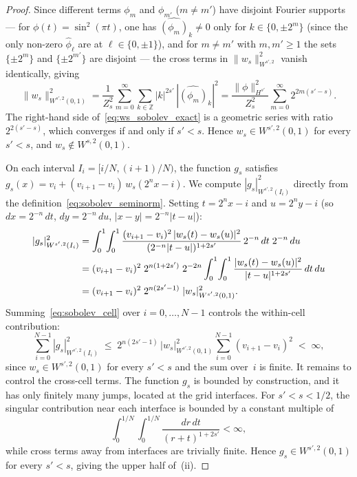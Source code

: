 \documentclass[12pt,a4paper]{article}
\theoremstyle{plain}
\theoremstyle{definition}
\theoremstyle{remark}
\begin{document}
\begin{proof}
Since different terms $\phi_m$ and $\phi_{m'}$ ($m\neq m'$) have
disjoint Fourier supports — for $\phi(t)=\sin^2(\pi t)$, one has
$\widehat{(\phi_m)}_k\neq 0$ only for $k\in\{0,\pm 2^m\}$
(since the only non-zero $\hat\phi_\ell$ are at $\ell\in\{0,\pm 1\}$),
and for $m\neq m'$ with $m,m'\geq 1$ the sets $\{\pm 2^m\}$ and
$\{\pm 2^{m'}\}$ are disjoint — the cross terms in $\|w_s\|^2_{W^{s',2}}$ vanish
identically, giving
\begin{equation}
  \|w_s\|^2_{W^{s',2}(0,1)}
  = \frac{1}{Z_s^2}
    \sum_{m=0}^\infty
    \sum_{k\in\mathbb{Z}}|k|^{2s'}\,|\widehat{(\phi_m)}_k|^2
  = \frac{\|\phi\|^2_{H^{s'}}}{Z_s^2}
    \sum_{m=0}^\infty 2^{2m(s'-s)}.
  \label{eq:ws_sobolev_exact}
\end{equation}
The right-hand side of~\eqref{eq:ws_sobolev_exact} is a geometric
series with ratio $2^{2(s'-s)}$, which converges if and only if
$s'<s$.
Hence $w_s\in W^{s',2}(0,1)$ for every $s'<s$, and
$w_s\notin W^{s,2}(0,1)$.

On each interval $I_i = [i/N,(i+1)/N)$, the function $g_s$ satisfies
$g_s(x) = v_i + (v_{i+1}-v_i)\,w_s(2^n x - i)$.
We compute $|g_s|^2_{W^{s',2}(I_i)}$ directly from the
definition~\eqref{eq:sobolev_seminorm}.
Setting $t = 2^n x - i$ and $u = 2^n y - i$
(so $dx = 2^{-n}\,dt$, $dy = 2^{-n}\,du$, $|x-y| = 2^{-n}|t-u|$):
\begin{align}
  |g_s|^2_{W^{s',2}(I_i)}
  &= \int_0^1\!\int_0^1
     \frac{(v_{i+1}-v_i)^2\,|w_s(t)-w_s(u)|^2}
          {(2^{-n}|t-u|)^{1+2s'}}\,
     2^{-n}\,dt\;2^{-n}\,du \notag\\
  &= (v_{i+1}-v_i)^2\;2^{n(1+2s')}\;2^{-2n}
     \int_0^1\!\int_0^1
     \frac{|w_s(t)-w_s(u)|^2}{|t-u|^{1+2s'}}\,dt\,du \notag\\
  &= (v_{i+1}-v_i)^2\;2^{n(2s'-1)}\;
     |w_s|^2_{W^{s',2}(0,1)}.
  \label{eq:sobolev_cell}
\end{align}
Summing~\eqref{eq:sobolev_cell} over $i = 0,\ldots,N-1$ controls the
within-cell contribution:
\[
  \sum_{i=0}^{N-1}|g_s|^2_{W^{s',2}(I_i)}
  \;\leq\; 2^{n(2s'-1)}\,|w_s|^2_{W^{s',2}(0,1)}
           \sum_{i=0}^{N-1}(v_{i+1}-v_i)^2
  \;<\; \infty,
\]
since $w_s \in W^{s',2}(0,1)$ for every $s'<s$ and the sum over~$i$
is finite.
It remains to control the cross-cell terms.  The function $g_s$ is
bounded by construction, and it has only finitely many jumps, located
at the grid interfaces.  For $s'<s<1/2$, the singular contribution
near each interface is bounded by a constant multiple of
\[
  \int_0^{1/N}\!\int_0^{1/N}\frac{dr\,dt}{(r+t)^{1+2s'}} < \infty,
\]
while cross terms away from interfaces are trivially finite.
Hence $g_s \in W^{s',2}(0,1)$ for every $s'<s$, giving the upper
half of~(ii).


\end{proof}
\end{document}
